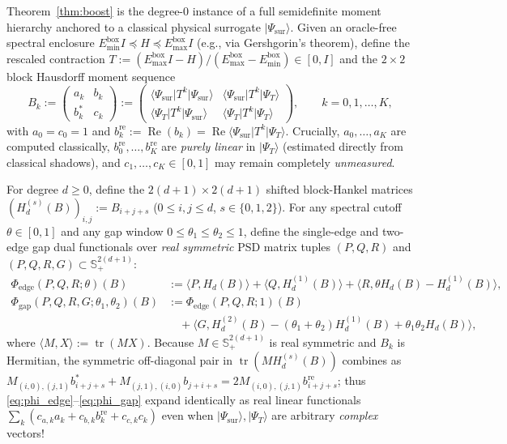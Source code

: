 \documentclass[11pt,a4paper]{article}
\theoremstyle{definition}
\DeclareMathOperator{\tr}{tr}
\newcommand{\ket}[1]{\lvert #1 \rangle}
\newcommand{\bra}[1]{\langle #1 \rvert}
\begin{document}
Theorem~\ref{thm:boost} is the degree-$0$ instance of a full semidefinite moment hierarchy anchored to a classical physical surrogate $\ket{\Psi_{\mathrm{sur}}}$. Given an oracle-free spectral enclosure $E_{\min}^{\mathrm{box}} I \preceq H \preceq E_{\max}^{\mathrm{box}} I$ (e.g., via Gershgorin's theorem), define the rescaled contraction $T := (E_{\max}^{\mathrm{box}} I - H)/(E_{\max}^{\mathrm{box}} - E_{\min}^{\mathrm{box}}) \in [0, I]$ and the $2\times 2$ block Hausdorff moment sequence \cite{schmudgen2017moment}
\[
  B_k := \begin{pmatrix} a_k & b_k \\ b_k^* & c_k \end{pmatrix}
  := \begin{pmatrix} \bra{\Psi_{\mathrm{sur}}} T^k \ket{\Psi_{\mathrm{sur}}} & \bra{\Psi_{\mathrm{sur}}} T^k \ket{\Psi_T} \\ \bra{\Psi_T} T^k \ket{\Psi_{\mathrm{sur}}} & \bra{\Psi_T} T^k \ket{\Psi_T} \end{pmatrix}, \qquad k = 0,1,\dots,K,
\]
with $a_0 = c_0 = 1$ and $b_k^{\mathrm{re}} := \operatorname{Re}(b_k) = \operatorname{Re}\bra{\Psi_{\mathrm{sur}}} T^k \ket{\Psi_T}$. Crucially, $a_0,\dots,a_K$ are computed classically, $b_0^{\mathrm{re}},\dots,b_K^{\mathrm{re}}$ are \emph{purely linear} in $\ket{\Psi_T}$ (estimated directly from classical shadows), and $c_1,\dots,c_K \in [0, 1]$ may remain completely \emph{unmeasured}.

For degree $d \ge 0$, define the $2(d+1)\times 2(d+1)$ shifted block-Hankel matrices $(H_d^{(s)}(B))_{i,j} := B_{i+j+s}$ ($0 \le i,j \le d$, $s \in \{0,1,2\}$). For any spectral cutoff $\theta \in [0,1]$ and any gap window $0 \le \theta_1 \le \theta_2 \le 1$, define the single-edge and two-edge gap dual functionals over \emph{real symmetric} PSD matrix tuples $(P,Q,R)$ and $(P,Q,R,G) \subset \mathbb{S}_+^{2(d+1)}$:
\begin{align}
  \Phi_{\mathrm{edge}}(P,Q,R;\theta)(B) &:= \langle P, H_d(B)\rangle + \langle Q, H_d^{(1)}(B)\rangle + \langle R, \theta H_d(B) - H_d^{(1)}(B)\rangle, \label{eq:phi_edge}\\
  \Phi_{\mathrm{gap}}(P,Q,R,G;\theta_1,\theta_2)(B) &:= \Phi_{\mathrm{edge}}(P,Q,R;1)(B) \nonumber\\
  &\quad + \langle G, H_d^{(2)}(B) - (\theta_1+\theta_2)H_d^{(1)}(B) + \theta_1\theta_2 H_d(B)\rangle, \label{eq:phi_gap}
\end{align}
where $\langle M, X\rangle := \tr(MX)$. Because $M \in \mathbb{S}_+^{2(d+1)}$ is real symmetric and $B_k$ is Hermitian, the symmetric off-diagonal pair in $\tr(M H_d^{(s)}(B))$ combines as $M_{(i,0),(j,1)} b_{i+j+s}^* + M_{(j,1),(i,0)} b_{j+i+s} = 2 M_{(i,0),(j,1)} b_{i+j+s}^{\mathrm{re}}$; thus \eqref{eq:phi_edge}--\eqref{eq:phi_gap} expand identically as real linear functionals $\sum_k (c_{a,k} a_k + c_{b,k} b_k^{\mathrm{re}} + c_{c,k} c_k)$ even when $\ket{\Psi_{\mathrm{sur}}}, \ket{\Psi_T}$ are arbitrary \emph{complex} vectors!
\end{document}
